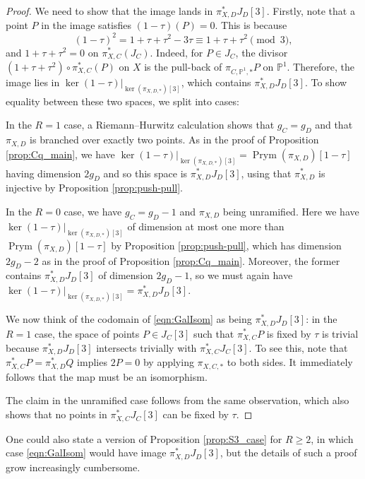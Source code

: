 \documentclass[12pt]{amsart}
\theoremstyle{definition}
\newenvironment{remark}
  {\pushQED{\qed}\renewcommand{\qedsymbol}{$\diamondsuit$}\remarkx}
  {\popQED\endremarkx}
\theoremstyle{remark}
\newcommand{\Proj}{\mathbb{P}}
\DeclareMathOperator{\Prym}{Prym}
\begin{document}
\begin{proof}
    We need to show that the image lands in $\pi_{X,D}^*J_D[3]$. Firstly, note that a point $P$ in the image satisfies $(1-\tau)(P)=0$. This is because 
    \[(1-\tau)^2 = 1+\tau+\tau^2-3\tau \equiv 1+\tau+\tau^2\pmod{3},\]
    and $1+\tau+\tau^2=0$ on $\pi^*_{X,C}(J_C)$. Indeed, for $P\in J_C$, the divisor $(1+\tau+\tau^2)\circ\pi_{X,C}^*(P)$ on $X$ is the pull-back of $\pi_{C,\Proj^1,*}P$ on $\Proj^1$. Therefore, the image lies in $\ker(1-\tau)|_{\ker(\pi_{X,D,*})[3]}$, which contains $\pi_{X,D}^*J_D[3]$. To show equality between these two spaces, we split into cases:

    In the $R=1$ case, a Riemann--Hurwitz calculation shows that $g_C=g_D$ and that $\pi_{X,D}$ is branched over exactly two points. As in the proof of Proposition \ref{prop:Cq_main}, we have $\ker(1-\tau)|_{\ker(\pi_{X,D,*})[3]}=\Prym(\pi_{X,D})[1-\tau]$ having dimension $2g_D$ and so this space is $\pi_{X,D}^*J_D[3]$, using that $\pi^*_{X,D}$ is injective by Proposition \ref{prop:push-pull}.

    In the $R=0$ case, we have $g_C=g_D-1$ and $\pi_{X,D}$ being unramified. Here we have $\ker(1-\tau)|_{\ker(\pi_{X,D,*})[3]}$ of dimension at most one more than $\Prym(\pi_{X,D})[1-\tau]$ by Proposition \ref{prop:push-pull}, which has dimension $2g_D-2$ as in the proof of Proposition \ref{prop:Cq_main}. Moreover, the former contains $\pi_{X,D}^*J_D[3]$ of dimension $2g_D-1$, so we must again have $\ker(1-\tau)|_{\ker(\pi_{X,D,*})[3]}=\pi_{X,D}^*J_D[3]$.

    We now think of the codomain of \eqref{eqn:GalIsom} as being $\pi_{X,D}^*J_D[3]$: in the $R=1$ case, the space of points $P\in J_C[3]$ such that $\pi_{X,C}^*P$ is fixed by $\tau$ is trivial because $\pi_{X,D}^*J_D[3]$ intersects trivially with $\pi_{X,C}^*J_C[3]$. To see this, note that $\pi_{X,C}^*P=\pi_{X,D}^*Q$ implies $2P=0$ by applying $\pi_{X,C,*}$ to both sides. It immediately follows that the map must be an isomorphism.
    
    The claim in the unramified case follows from the same observation, which also shows that no points in $\pi_{X,C}^*J_C[3]$ can be fixed by $\tau$.
\end{proof}

\begin{remark}
    One could also state a version of Proposition \ref{prop:S3_case} for $R\ge2$, in which case \eqref{eqn:GalIsom} would have image $\pi_{X,D}^*J_D[3]$, but the details of such a proof grow increasingly cumbersome.
\end{remark}
\end{document}

